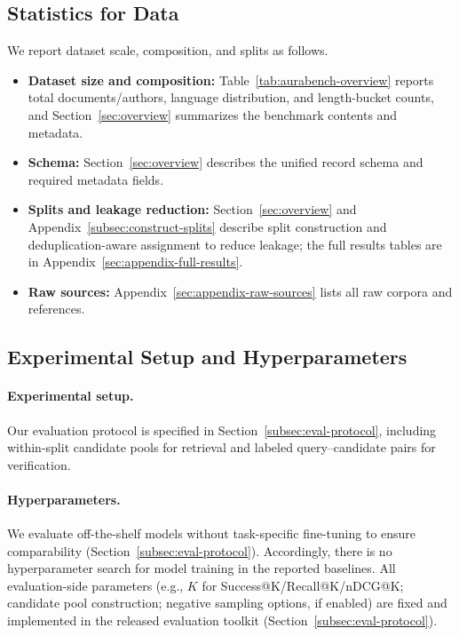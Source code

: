 \documentclass[11pt]{article}
\begin{document}
\subsection{Statistics for Data}
\label{sec:checklist-b6}
We report dataset scale, composition, and splits as follows.
\begin{itemize}
  \item \textbf{Dataset size and composition:} Table~\ref{tab:aurabench-overview} reports total documents/authors, language distribution, and length-bucket counts, and Section~\ref{sec:overview} summarizes the benchmark contents and metadata.
  \item \textbf{Schema:} Section~\ref{sec:overview} describes the unified record schema and required metadata fields.
  \item \textbf{Splits and leakage reduction:} Section~\ref{sec:overview} and Appendix~\ref{subsec:construct-splits} describe split construction and deduplication-aware assignment to reduce leakage; the full results tables are in Appendix~\ref{sec:appendix-full-results}.
  \item \textbf{Raw sources:} Appendix~\ref{sec:appendix-raw-sources} lists all raw corpora and references.
\end{itemize}


\subsection{Experimental Setup and Hyperparameters}
\label{sec:checklist-c2}
\paragraph{Experimental setup.}
Our evaluation protocol is specified in Section~\ref{subsec:eval-protocol}, including within-split candidate pools for retrieval and labeled query--candidate pairs for verification.

\paragraph{Hyperparameters.}
We evaluate off-the-shelf models without task-specific fine-tuning to ensure comparability (Section~\ref{subsec:eval-protocol}).
Accordingly, there is no hyperparameter search for model training in the reported baselines.
All evaluation-side parameters (e.g., $K$ for Success@K/Recall@K/nDCG@K; candidate pool construction; negative sampling options, if enabled) are fixed and implemented in the released evaluation toolkit (Section~\ref{subsec:eval-protocol}).
\end{document}
